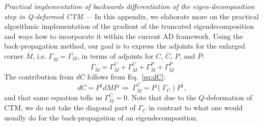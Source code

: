 \documentclass[twocolumn,floatfix,superscriptaddress,longbibliography,pra]{revtex4-2}
\renewcommand{\section}[1]{\emph{#1.---}}
\begin{document}
\section{Practical implementation of backwards differentiation of the eigen-decomposition step in Q-deformed CTM}
\label{app:practical_gradient}
In this appendix, we elaborate more on the practical algorithmic implementation of the gradient of the truncated eigendecomposition and ways how to incorporate it within the current AD framework. Using the back-propagation method, our goal is to express the adjoints for the enlarged corner $\overline{M}$, i.e. $\Gamma_{\overline{M}}=\overline{\Gamma_M}$, in terms of adjoints for $C$, $\overline{C}$, $P$, and $\overline{P}$:
\begin{equation}
    \Gamma_{\overline{M}} = \Gamma^C_{\overline{M}} + \Gamma^{\overline{C}}_{\overline{M}} + \Gamma^P_{\overline{M}} + \Gamma^{\overline{P}}_{\overline{M}}
\end{equation}
The contribution from $d\overline{C}$ follows from Eq.~\eqref{eq:dC}:
\begin{equation}
    dC = P^\dagger dM P~\Rightarrow~ \Gamma^{\overline{C}}_{\overline{M}} = P(\Gamma_{\overline{C}})P^\dagger,
\end{equation}
and that same equation tells us $\Gamma^C_{\overline{M}}=0$. Note that due to the $Q$-deformation of CTM, we do not take the diagonal part of $\Gamma_C$ in contrast to what one would usually do for the back-propagation of an eigendecomposition. 
\end{document}
